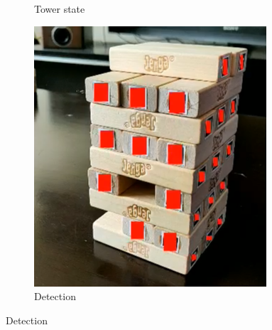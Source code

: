 \begin{figure}[p]
\begin{subfigure}{0.3\textwidth}
\caption{Tower state} \label{fig:a}
\end{subfigure}
\hspace*{\fill}
\begin{subfigure}{0.3\textwidth}
\includegraphics[width=\linewidth,keepaspectratio]{images/implementation/detection}
\caption{Detection} \label{fig:b}
\end{subfigure}
\hspace*{\fill}

\medskip


\end{figure}
